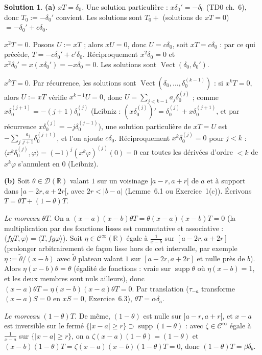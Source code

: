 \documentclass[11pt,a4paper]{article}
\newcommand{\R}{\mathbb{R}}
\newcommand{\Vect}{\operatorname{Vect}}
\newcommand{\Cinf}{\mathcal{C}^\infty}
\DeclareMathOperator{\supp}{supp}
\newcommand{\D}{\mathcal{D}}
\theoremstyle{definition}
\newtheorem*{solution}{Solution}
\begin{document}
\begin{solution}
\noindent\textbf{(a)} \emph{$xT=\delta_0$.} Une solution particulière : $x\delta_0'=-\delta_0$ (TD0 ch.~6), donc $T_0:=-\delta_0'$ convient. Les solutions sont $T_0+$ (solutions de $xT=0$) $=-\delta_0'+c\delta_0$.

\emph{$x^2T=0$.} Posons $U:=xT$ ; alors $xU=0$, donc $U=c\delta_0$, soit $xT=c\delta_0$ : par ce qui précède, $T=-c\delta_0'+c'\delta_0$. Réciproquement $x^2\delta_0=0$ et $x^2\delta_0'=x(x\delta_0')=-x\delta_0=0$. Les solutions sont $\Vect(\delta_0,\delta_0')$.

\emph{$x^kT=0$.} Par récurrence, les solutions sont $\Vect(\delta_0,\dots,\delta_0^{(k-1)})$ : si $x^kT=0$, alors $U:=xT$ vérifie $x^{k-1}U=0$, donc $U=\sum_{j<k-1}a_j\delta_0^{(j)}$ ; comme $x\delta_0^{(j+1)}=-(j+1)\delta_0^{(j)}$ (Leibniz : $(x\delta_0^{(j)})'=\delta_0^{(j)}+x\delta_0^{(j+1)}$, et par récurrence $x\delta_0^{(j)}=-j\delta_0^{(j-1)}$), une solution particulière de $xT=U$ est $-\sum_j\frac{a_j}{j+1}\delta_0^{(j+1)}$, et l'on ajoute $c\delta_0$. Réciproquement $x^k\delta_0^{(j)}=0$ pour $j<k$ : $\langle x^k\delta_0^{(j)},\varphi\rangle=(-1)^j(x^k\varphi)^{(j)}(0)=0$ car toutes les dérivées d'ordre $<k$ de $x^k\varphi$ s'annulent en $0$ (Leibniz).

\medskip
\noindent\textbf{(b)} Soit $\theta\in\D(\R)$ valant $1$ sur un voisinage $]a-r,a+r[$ de $a$ et à support dans $]a-2r,a+2r[$, avec $2r<|b-a|$ (Lemme~6.1 ou Exercice~1(c)). Écrivons $T=\theta T+(1-\theta)T$.

\emph{Le morceau $\theta T$.} On a $(x-a)(x-b)\theta T=\theta(x-a)(x-b)T=0$ (la multiplication par des fonctions lisses est commutative et associative : $\langle fgT,\varphi\rangle=\langle T,fg\varphi\rangle$). Soit $\eta\in\Cinf(\R)$ égale à $\frac1{x-b}$ sur $[a-2r,a+2r]$ (prolonger arbitrairement de façon lisse hors de cet intervalle, par exemple $\eta:=\tilde\theta/(x-b)$ avec $\tilde\theta$ plateau valant $1$ sur $[a-2r,a+2r]$ et nulle près de $b$). Alors $\eta(x-b)\theta=\theta$ (égalité de fonctions : vraie sur $\supp\theta$ où $\eta(x-b)=1$, et les deux membres sont nuls ailleurs), donc $(x-a)\theta T=\eta(x-b)(x-a)\theta T=0$. Par translation ($\tau_{-a}$ transforme $(x-a)S=0$ en $xS=0$, Exercice~6.3), $\theta T=\alpha\delta_a$.

\emph{Le morceau $(1-\theta)T$.} De même, $(1-\theta)$ est nulle sur $]a-r,a+r[$, et $x-a$ est inversible sur le fermé $\{|x-a|\ge r\}\supset\supp(1-\theta)$ : avec $\zeta\in\Cinf$ égale à $\frac1{x-a}$ sur $\{|x-a|\ge r\}$, on a $\zeta(x-a)(1-\theta)=(1-\theta)$ et $(x-b)(1-\theta)T=\zeta(x-a)(x-b)(1-\theta)T=0$, donc $(1-\theta)T=\beta\delta_b$.


\end{solution}
\end{document}
